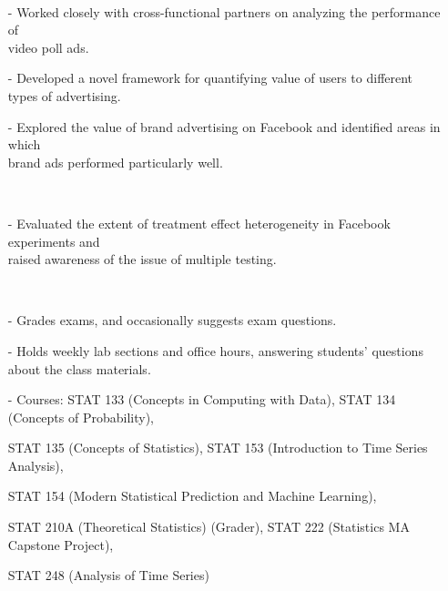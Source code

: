 \documentclass{res}
\begin{document}
\begin{resume}
     \\ 
            \begin{itemize}\setlength\itemsep{0em}
        \item[-] Worked closely with cross-functional partners on analyzing the performance of \\video poll ads. 
\item[-]  Developed a novel framework for quantifying value of users to different types of advertising. 
\item[-] Explored the value of brand advertising on Facebook and identified areas in which \\brand ads performed particularly well. 
        \end{itemize}

     \\ 
            \begin{itemize}\setlength\itemsep{0em}
        \item[-] Evaluated the extent of treatment effect heterogeneity in Facebook experiments and \\raised awareness of the issue of multiple testing.
        \end{itemize}
  

     \\ 
            \begin{itemize}\setlength\itemsep{0em}
        \item[-] Grades exams, and occasionally suggests exam questions. 
        \item[-] Holds weekly lab sections and office hours, answering students' questions about the class materials.
        \item[-] Courses: STAT 133 (Concepts in Computing with Data), STAT 134 (Concepts of Probability), 
        \item[] STAT 135 (Concepts of Statistics), 
        STAT 153 (Introduction to Time Series Analysis), 
        \item[] STAT 154 (Modern Statistical Prediction and Machine Learning), 
        \item[] STAT 210A (Theoretical Statistics) (Grader), 
         STAT 222 (Statistics MA Capstone Project),
         \item[] STAT 248 (Analysis of Time Series)
        \end{itemize}
  

\end{resume}
\end{document}
